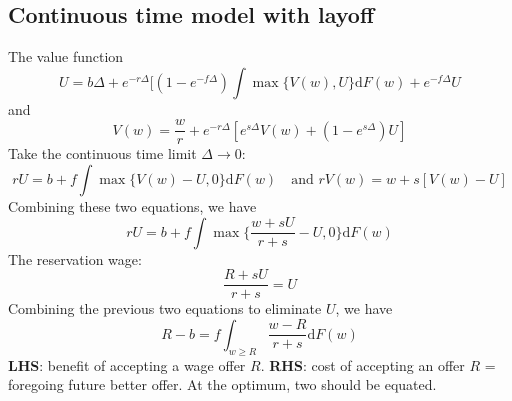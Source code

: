 \documentclass[11pt,a4paper]{article}
\begin{document}

\subsection{Continuous time model with layoff}
The value function 
\begin{equation}
  U = b \Delta + e^{-r\Delta}[(1-e^{-f \Delta }) \int \max \{ V(w),U\} \mathrm{d}F(w) + e^{-f \Delta }U\label{eq:val}
\end{equation}
and 
\begin{equation}
  V(w) = \frac{w}{r} + e^{-r\Delta} [e^{s \Delta }V(w) + (1-e^{s \Delta })U] \label{eq:val2}
\end{equation}
Take the continuous time limit $\Delta \to 0$:
\begin{equation}
  r U = b + f \int\max \{V(w)- U,0\}\mathrm{d}F(w) \quad \text{and } r V(w) = w + s[V(w)-U] \label{eq:val3}
\end{equation}
Combining these two equations, we have
\begin{equation}
  r U = b + f \int \max \{\frac{w+sU}{r+s}-U,0\}\mathrm{d}F(w) \label{eq:val4}
\end{equation}
The reservation wage:
\begin{equation}
  \frac{R+ sU}{r+s} = U
\end{equation}
Combining the previous two equations to eliminate $U$, we have
\begin{equation}
  R - b = f \int_{w\geq R} \frac{w-R}{r+s} \mathrm{d}F(w)\label{eq:reserv}
\end{equation}
\textbf{LHS}: benefit of accepting a wage offer $R$. 
\textbf{RHS}: cost of accepting an offer $R$ = foregoing future better offer. 
At the optimum, two should be equated. 
\end{document}
